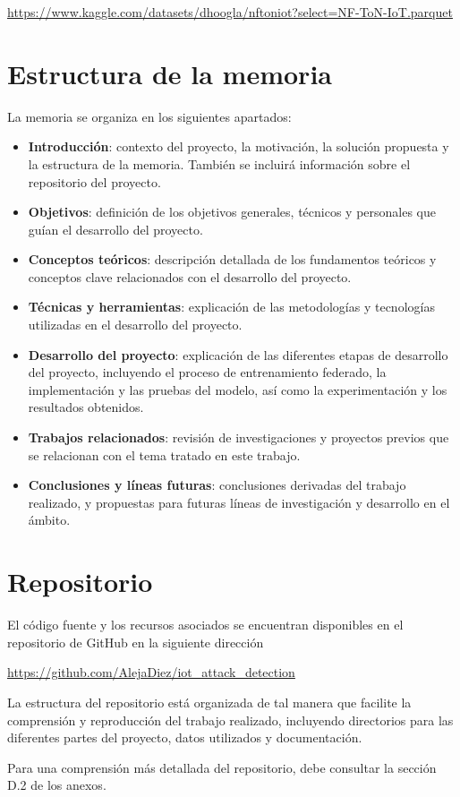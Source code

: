 \url{https://www.kaggle.com/datasets/dhoogla/nftoniot?select=NF-ToN-IoT.parquet}

\section{Estructura de la memoria}
\label{sec:Estructura}
La memoria se organiza en los siguientes apartados:
\begin{itemize}
    \item \textbf{Introducción}: contexto del proyecto, la motivación, la solución propuesta y la estructura de la memoria. También se incluirá información sobre el repositorio del proyecto.
    \item \textbf{Objetivos}: definición de los objetivos generales, técnicos y personales que guían el desarrollo del proyecto.
    \item \textbf{Conceptos teóricos}: descripción detallada de los fundamentos teóricos y conceptos clave relacionados con el desarrollo del proyecto.
    \item \textbf{Técnicas y herramientas}: explicación de las metodologías y tecnologías utilizadas en el desarrollo del proyecto.
    \item \textbf{Desarrollo del proyecto}: explicación de las diferentes etapas de desarrollo del proyecto, incluyendo el proceso de entrenamiento federado, la implementación y las pruebas del modelo, así como la experimentación y los resultados obtenidos.
    \item \textbf{Trabajos relacionados}: revisión de investigaciones y proyectos previos que se relacionan con el tema tratado en este trabajo.
    \item \textbf{Conclusiones y líneas futuras}: conclusiones derivadas del trabajo realizado, y propuestas para futuras líneas de investigación y desarrollo en el ámbito.
\end{itemize}

\section{Repositorio}
\label{sec:Repositorio}
El código fuente y los recursos asociados se encuentran disponibles en el repositorio de GitHub en la siguiente dirección

\url{https://github.com/AlejaDiez/iot_attack_detection}

La estructura del repositorio está organizada de tal manera que facilite la comprensión y reproducción del trabajo realizado, incluyendo directorios para las diferentes partes del proyecto, datos utilizados y documentación.

Para una comprensión más detallada del repositorio, debe consultar la sección D.2 de los anexos.
